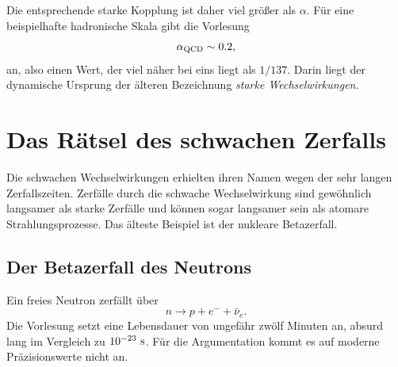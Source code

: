 Die entsprechende starke Kopplung ist daher viel größer als \(\alpha\). Für eine beispielhafte hadronische Skala gibt die Vorlesung \begin{equation}
\alpha_{\rm QCD}\sim0.2,
\end{equation} an, also einen Wert, der viel näher bei eins liegt als \(1/137\). Darin liegt der dynamische Ursprung der älteren Bezeichnung \emph{starke Wechselwirkungen}.

\begin{classroomqa}\end{classroomqa}

\begin{classroomqa}\end{classroomqa}

\section{Das Rätsel des schwachen Zerfalls}

Die schwachen Wechselwirkungen erhielten ihren Namen wegen der sehr langen Zerfallszeiten. Zerfälle durch die schwache Wechselwirkung sind gewöhnlich langsamer als starke Zerfälle und können sogar langsamer sein als atomare Strahlungsprozesse. Das älteste Beispiel ist der nukleare Betazerfall.

\subsection{Der Betazerfall des Neutrons}

Ein freies Neutron zerfällt über
\begin{equation}
n\longrightarrow p+e^-+\bar\nu_e.
\label{eq:l5-neutron-decay-intro}
\end{equation}
Die Vorlesung setzt eine Lebensdauer von ungefähr zwölf Minuten an, absurd lang im Vergleich zu \(10^{-23}\ {\rm s}\). Für die Argumentation kommt es auf moderne Präzisionswerte nicht an.


